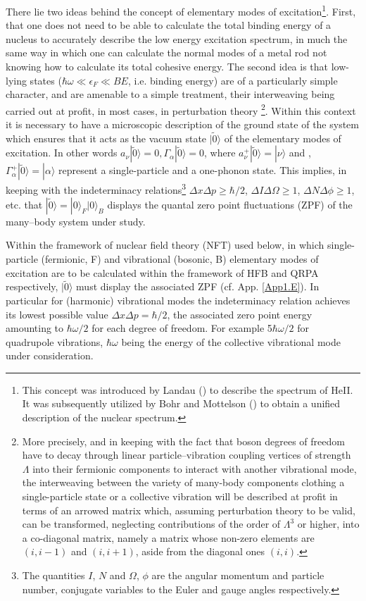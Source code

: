 There lie two ideas behind the concept of elementary modes of excitation\footnote{This concept was introduced by Landau (\cite{Landau:41}) to describe the spectrum of HeII. It was subsequently utilized by Bohr and Mottelson (\cite{Bohr:75}) to obtain a unified description of the nuclear spectrum.}. First, that one does not need to be able to calculate the total binding
energy  of a nucleus to accurately describe the low energy excitation spectrum, in much the same way in which one can calculate 
the normal modes of a metal rod not knowing how to  calculate its total cohesive energy.
The second idea is that low-lying states ($\hbar \omega \ll \epsilon_F \ll BE$, i.e. binding energy) are of a particularly simple
character, and are amenable to a simple treatment, their
interweaving  being carried out at profit, in most cases,  in perturbation theory
\footnote{More precisely, and in keeping with  the fact that 
boson degrees of freedom have to decay through linear particle--vibration 
coupling vertices of strength $\Lambda$ into their fermionic components to interact with another vibrational mode,
the interweaving between the variety of many-body components clothing a single-particle state 
or a collective vibration will be described at profit in terms of an arrowed matrix which, assuming perturbation theory
to be valid, can be transformed, neglecting contributions of the order of $\Lambda^3$ or higher, into a co-diagonal matrix, namely a matrix 
whose non-zero elements are $(i,i-1)$ and $(i,i+1)$,  aside from  the diagonal ones $(i,i)$.}. 
Within this context it is  necessary to have a microscopic description 
of the ground  state of the system  which ensures that it acts as the vacuum state 
$|\tilde0\rangle  $ of the elementary modes of excitation. In other words $a_{\nu}|\tilde 0 \rangle   = 0, \Gamma_{\alpha} |\tilde 0\rangle   =0$, where
$a^+_{\nu}|\tilde 0 \rangle   = |\nu\rangle  $ and , $\Gamma^+_{\alpha} |\tilde 0\rangle   =|\alpha\rangle  $ represent a single-particle and a one-phonon state.
This   implies, in keeping 
with the indeterminacy  relations\footnote{The quantities $I$, $N$ and $\Omega$, $\phi$ are the angular momentum and particle number, conjugate variables to the Euler and gauge angles respectively.} $\Delta x \Delta p \geq \hbar/2$, $\Delta I \Delta \Omega \geq 1$, $\Delta N \Delta \phi \geq 1$, etc.  that $|\tilde 0\rangle   = |0\rangle  _F |0\rangle  _B$
displays the  quantal zero point fluctuations (ZPF) of the many--body system under study.

Within the framework of nuclear field theory (NFT) used below, in which single-particle (fermionic, F) and vibrational
(bosonic, B) elementary modes of excitation are to be calculated within the framework of HFB and QRPA
respectively, $|\tilde 0\rangle  $ must display the associated ZPF (cf. App. \ref{App1.E}). In particular for (harmonic) vibrational modes the indeterminacy relation achieves its lowest possible value 
$\Delta x \Delta p = \hbar/2$, the associated zero point energy amounting to $\hbar \omega/2$
for each degree of freedom. For example 5$\hbar \omega/2$ for quadrupole vibrations, 
$\hbar \omega$ being the energy of the collective vibrational mode under consideration. 




